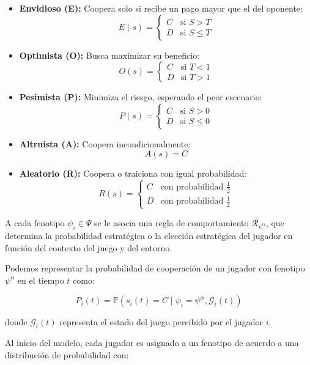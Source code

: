 \documentclass[a4paper,12pt]{report}
\begin{document}
\begin{itemize}
  \item \textbf{Envidioso (E):} Coopera solo si recibe un pago mayor que el del oponente:
  \[
  E(s) =
  \begin{cases}
    C & \text{si } S > T \\
    D & \text{si } S \leq T
  \end{cases}
  \]

  \item \textbf{Optimista (O):} Busca maximizar su beneficio:
  \[
  O(s) =
  \begin{cases}
    C & \text{si } T < 1 \\
    D & \text{si } T > 1
  \end{cases}
  \]

  \item \textbf{Pesimista (P):} Minimiza el riesgo, esperando el peor escenario:
  \[
  P(s) =
  \begin{cases}
    C & \text{si } S > 0 \\
    D & \text{si } S \leq 0
  \end{cases}
  \]

  \item \textbf{Altruista (A):} Coopera incondicionalmente:
  \[
  A(s) = C
  \]

  \item \textbf{Aleatorio (R):} Coopera o traiciona con igual probabilidad:
  \[
  R(s) =
  \begin{cases}
    C & \text{con probabilidad } \frac{1}{2} \\
    D & \text{con probabilidad } \frac{1}{2}
  \end{cases}
  \]
\end{itemize}
\justifying
A cada fenotipo \( \psi_i \in \Psi \) se le asocia una regla de comportamiento \( \mathcal{R}_{\psi^\alpha} \), que determina la probabilidad estratégica o la elección estratégica del jugador en función del contexto del juego y del entorno.

Podemos representar la probabilidad de cooperación de un jugador con fenotipo \( \psi^\alpha \) en el tiempo \( t \) como:

\[
P_i(t) = \mathbb{P}(s_i(t) = C \mid \psi_i = \psi^\alpha, \mathcal{G}_i(t))
\]

donde \( \mathcal{G}_i(t) \) representa el estado del juego percibido por el jugador \( i \).

Al inicio del modelo, cada jugador es asignado a un fenotipo de acuerdo a una distribución de probabilidad con:
\end{document}
